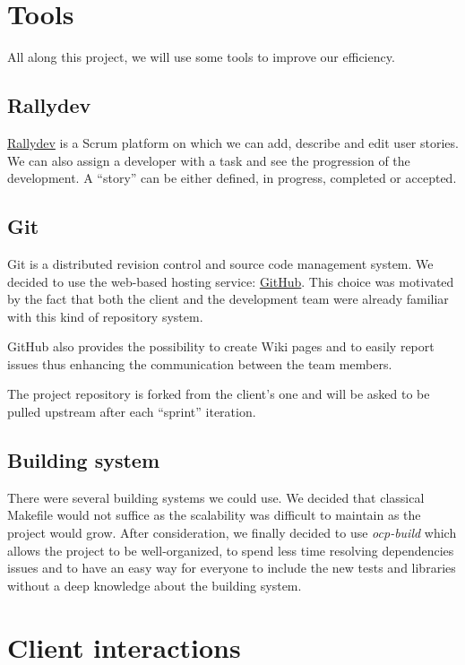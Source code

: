 \documentclass[12pt,a4paper]{article}
\begin{document}
\section{Tools}

All along this project, we will use some tools to improve our
efficiency.

\subsection{Rallydev}

\href{http://rally1.rallydev.com/}{Rallydev} is a Scrum platform on which we can add, describe and edit
user stories. We can also assign a developer with a task and see the
progression of the development. A ``story'' can be either defined, in
progress, completed or accepted.

\subsection{Git}

Git is a distributed revision control and source code management system. We decided to use the web-based hosting service: \href{http://github.com/}{GitHub}. This choice was motivated by the fact that both the client and the development team were already familiar with this kind of repository system.

GitHub also provides the possibility to create Wiki pages and to easily report issues thus enhancing the communication between the team members.

The project repository is forked from the client's one and will be asked to be pulled upstream after each ``sprint'' iteration.

\subsection{Building system}

There were several building systems we could use. We decided that
classical Makefile would not suffice as the scalability was difficult
to maintain as the project would grow. After consideration, we finally
decided to use \emph{ocp-build} which allows the project to be
well-organized, to spend less time resolving dependencies issues and
to have an easy way for everyone to include the new tests and
libraries without a deep knowledge about the building system.

\section{Client interactions}
\end{document}
